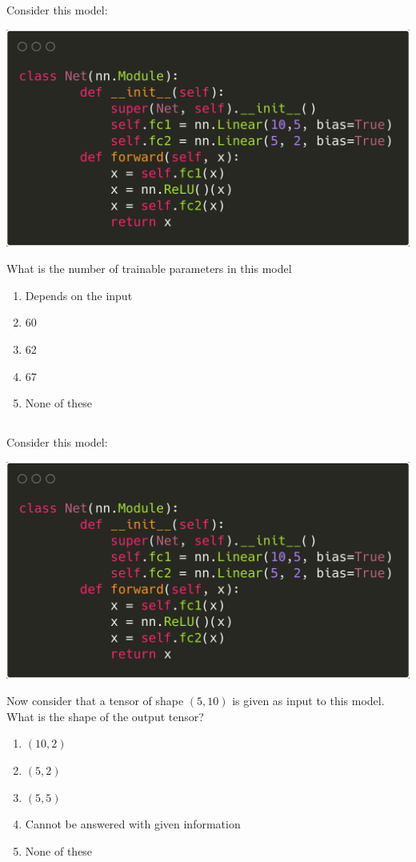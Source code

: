 \begin{frame}
\section{}
Consider this model:

\includegraphics[scale=0.1]{images/q33_1.png}

What is the number of trainable parameters in this model
\begin{enumerate}[label=(\Alph*)]
\item Depends on the input
\item 60
\item 62
\item 67    %
\item None of these   %
\end{enumerate}
\end{frame}

\begin{frame}
\section{}
Consider this model:

\includegraphics[scale=0.1]{images/q33_2.png}

Now consider that a tensor of shape $(5,10)$ is given as input to this model. What is the shape of the output tensor?
\begin{enumerate}[label=(\Alph*)]
\item $(10,2)$
\item $(5,2)$    %
\item $(5,5)$
\item Cannot be answered with given information
\item None of these   %
\end{enumerate}
\end{frame}

